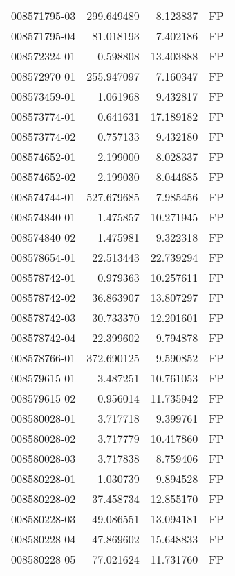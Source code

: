 \begin{tabular}{lrrl}
008571795-03 &  299.649489 &       8.123837 &   FP \\
008571795-04 &   81.018193 &       7.402186 &   FP \\
008572324-01 &    0.598808 &      13.403888 &   FP \\
008572970-01 &  255.947097 &       7.160347 &   FP \\
008573459-01 &    1.061968 &       9.432817 &   FP \\
008573774-01 &    0.641631 &      17.189182 &   FP \\
008573774-02 &    0.757133 &       9.432180 &   FP \\
008574652-01 &    2.199000 &       8.028337 &   FP \\
008574652-02 &    2.199030 &       8.044685 &   FP \\
008574744-01 &  527.679685 &       7.985456 &   FP \\
008574840-01 &    1.475857 &      10.271945 &   FP \\
008574840-02 &    1.475981 &       9.322318 &   FP \\
008578654-01 &   22.513443 &      22.739294 &   FP \\
008578742-01 &    0.979363 &      10.257611 &   FP \\
008578742-02 &   36.863907 &      13.807297 &   FP \\
008578742-03 &   30.733370 &      12.201601 &   FP \\
008578742-04 &   22.399602 &       9.794878 &   FP \\
008578766-01 &  372.690125 &       9.590852 &   FP \\
008579615-01 &    3.487251 &      10.761053 &   FP \\
008579615-02 &    0.956014 &      11.735942 &   FP \\
008580028-01 &    3.717718 &       9.399761 &   FP \\
008580028-02 &    3.717779 &      10.417860 &   FP \\
008580028-03 &    3.717838 &       8.759406 &   FP \\
008580228-01 &    1.030739 &       9.894528 &   FP \\
008580228-02 &   37.458734 &      12.855170 &   FP \\
008580228-03 &   49.086551 &      13.094181 &   FP \\
008580228-04 &   47.869602 &      15.648833 &   FP \\
008580228-05 &   77.021624 &      11.731760 &   FP \\

\end{tabular}
